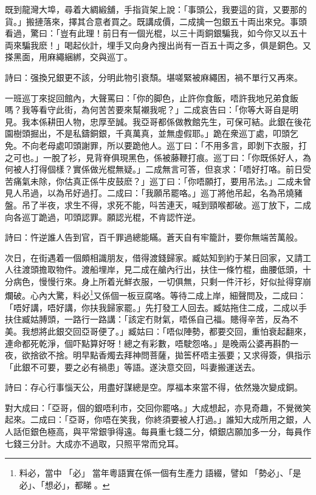 \documentclass[a5paper, 12pt, openany]{book} %
\begin{document}
	既到龍灣大埠，尋着大綢緞舖，手指貨架上說：「事頭公，我要這的貨，又要那的貨。」搬摙落來，擇其合意者買之。既講成價，二成擒一包銀五十両出來兌。事頭看過，驚曰：「豈有此理！前日有一個光棍，以三十両銅銀騙我，如今你又以五十両來騙我麽！」喝起伙計，埋手又向身內搜出尚有一百五十両之多，俱是銅色。又搽黑面，用麻繩綑綁，交與巡丁。

	詩曰：强換兄銀更不該，分明此物引衰頹。堪嗟緊被麻繩困，禍不單行又再來。

	一班巡丁來捉回館內，大聲罵曰：「你的脚色，止許你食飯，唔許我地兄弟食飯嗎？我等看守此街，為何苦苦要來幫襯我呢？」二成哀告曰：「你等大哥自是明見。我本係耕田人物，忠厚至誠。我亞哥都係做教館先生，可保可結。此銀在後花園樹頭掘出，不是私鑄銅銀，千真萬真，並無虛假耶。」跪在衆巡丁處，叩頭乞免。不向老母處叩頭謝罪，所以要跪他人。巡丁曰：「不用多言，即剝下衣服，打之可也。」一脫了衫，見背脊俱現黑色，係被藤鞭打痕。巡丁曰：「你既係好人，為何被人打得個樣？實係做光棍無疑。」二成無言可答，但哀求：「唔好打咯。前日受苦痛氣未除，你估真正係牛皮鼓麽？」巡丁曰：「你唔願打，要用吊法。」二成未曾見人吊過，以為吊好過打。二成曰：「我願吊罷咯。」巡丁將他吊起，名為吊燒豬盤。吊了半夜，求生不得，求死不能，呌苦連天，喊到頸喉都破。巡丁放下，二成向各巡丁跪過，叩頭認罪。願認光棍，不肯認忤逆。

	詩曰：忤逆誰人告到官，百千罪過總能瞞。蒼天自有牢籠計，要你無端苦萬般。

	次日，在街遇着一個頗相識朋友，借得渡錢歸家。臧姑知到約于某日回家，又請工人往渡頭擔取物件。渡船埋岸，見二成在艙內行出，扶住一條竹棍，曲腰低頭，十分病色，慢慢行來。身上所着光鮮衣服，一切俱無，只剩一件汗衫，好似扯得穿崩爛破。心內大驚，料必\footnote{料必，當中󱝚「必」󱪙當年粵語實在係一個有生產力󱝚語綴，譬如󱪙「勢必」、「是必」、「想必」，都睇󰧱。}又係個一板豆腐咯。等待二成上岸，細聲問及，二成曰：「唔好講，唔好講，你扶我歸家罷。」先打發工人回去。臧姑拖住二成，二成以手扶住臧姑膊頭，一路行一路講：「該定冇財氣，唔係自己福。贃得辛苦，反為不美。我想將此銀交回亞哥便了。」臧姑曰：「唔似陣勢，都要交回，重怕衰起翻來，連命都死乾淨，個吓點算好呀！總之有彩數，唔駛怨咯。」是晚兩公婆再斟酌一夜，欲捨欲不捨。明早點香燭去拜神問菩薩，拋筶杯唔主張要；又求得簽，俱指示「此銀不可要，要之必有禍患」等語。遂決意交回，呌妻搬運送去。

	詩曰：存心行事惱天公，用盡好謀總是空。厚福本來當不得，依然幾次變成銅。

	對大成曰：「亞哥，個的銀唔利市，交回你罷咯。」大成想起，亦見奇趣，不覺微笑起來。二成曰：「亞哥，你唔在笑我，你終須要被人打過。」誰知大成所用之銀，人人話佢銀色極高，與平常銀爭得遠。每員重七錢二分，傾銀店願加多一分，每員作七錢三分計。大成亦不過取，只照平常而兌耳。
\end{document}
